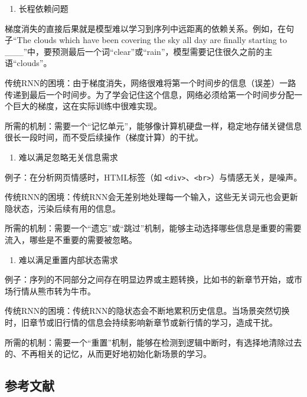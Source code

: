 \begin{enumerate}
\def\labelenumi{\arabic{enumi}.}
\setcounter{enumi}{1}
\tightlist
\item
  长程依赖问题
\end{enumerate}

梯度消失的直接后果就是模型难以学习到序列中远距离的依赖关系。例如，在句子``The clouds which have been covering the sky all day are finally starting to \_\_\_''中，要预测最后一个词``clear''或``rain''，模型需要记住很久之前的主语``clouds''。

传统RNN的困境：由于梯度消失，网络很难将第一个时间步的信息（误差）一路传递到最后一个时间步。为了学会记住这个信息，网络必须给第一个时间步分配一个巨大的梯度，这在实际训练中很难实现。

所需的机制：需要一个``记忆单元''，能够像计算机硬盘一样，稳定地存储关键信息很长一段时间，而不受后续操作（梯度计算）的干扰。

\begin{enumerate}
\def\labelenumi{\arabic{enumi}.}
\setcounter{enumi}{2}
\tightlist
\item
  难以满足忽略无关信息需求
\end{enumerate}

例子：在分析网页情感时，HTML标签（如 \texttt{\textless{}div\textgreater{}}、\texttt{\textless{}br\textgreater{}}）与情感无关，是噪声。

传统RNN的困境：传统RNN会无差别地处理每一个输入，这些无关词元也会更新隐状态，污染后续有用的信息。

所需的机制：需要一个``遗忘''或``跳过''机制，能够主动选择哪些信息是重要的需要流入，哪些是不重要的需要被忽略。

\begin{enumerate}
\def\labelenumi{\arabic{enumi}.}
\setcounter{enumi}{3}
\tightlist
\item
  难以满足重置内部状态需求
\end{enumerate}

例子：序列的不同部分之间存在明显边界或主题转换，比如书的新章节开始，或市场行情从熊市转为牛市。

传统RNN的困境：传统RNN的隐状态会不断地累积历史信息。当场景突然切换时，旧章节或旧行情的信息会持续影响新章节或新行情的学习，造成干扰。

所需的机制：需要一个``重置''机制，能够在检测到逻辑中断时，有选择地清除过去的、不再相关的记忆，从而更好地初始化新场景的学习。

\hypertarget{ux53c2ux8003ux6587ux732e-16}{%
\subsection{参考文献}\label{ux53c2ux8003ux6587ux732e-16}}

